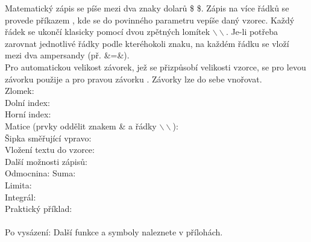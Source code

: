 \documentclass[a4paper, 12pt]{report}
\begin{document}
	Matematický zápis se píše mezi dva znaky dolarů \$ \$. Zápis na více řádků se provede příkazem , kde se do povinného parametru vepíše daný vzorec. Každý řádek se ukončí klasicky pomocí dvou zpětných lomítek $\backslash \backslash$.  Je-li potřeba zarovnat jednotlivé řádky podle kteréhokoli znaku, na každém řádku se vloží mezi dva ampersandy (př. \&=\&).\\
	Pro automatickou velikost závorek, jež se přizpůsobí velikosti vzorce, se pro levou závorku použije  a pro pravou závorku . Závorky lze do sebe vnořovat.\\[1cm]
	Zlomek: \\
	Dolní index: \\
	Horní index: \\
	Matice (prvky oddělit znakem \& a řádky $\backslash \backslash$): \\
	Šipka směřující vpravo: \\
	Vložení textu do vzorce: \\[1cm]
	Další možnosti zápisů:\\
	Odmocnina: 
	Suma: \\
	Limita: \\
	Integrál: \\[1cm]
	\novastrana
	Praktický příklad:\\
	\\[1cm]
	Po vysázení:
	Další funkce a symboly naleznete v přílohách.
	
\end{document}
